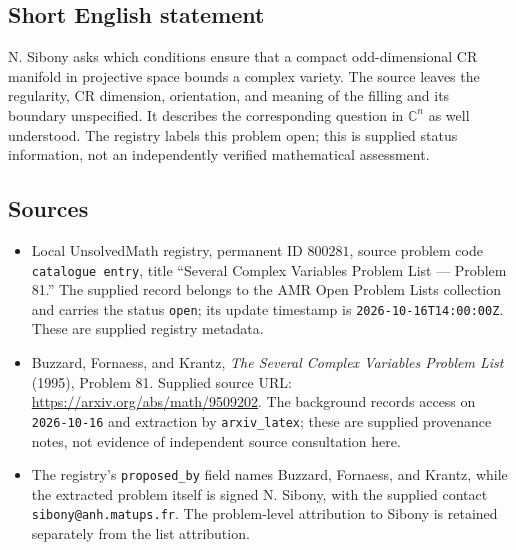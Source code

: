 \documentclass[11pt]{article}
\newcommand{\C}{\mathbb{C}}
\begin{document}
\subsection{Short English statement}
N. Sibony asks which conditions ensure that a compact odd-dimensional CR manifold in projective space bounds a complex variety. The source leaves the regularity, CR dimension, orientation, and meaning of the filling and its boundary unspecified. It describes the corresponding question in \(\C^n\) as well understood. The registry labels this problem open; this is supplied status information, not an independently verified mathematical assessment.
\subsection{Sources}
\begin{itemize}
\item Local UnsolvedMath registry, permanent ID \(800281\), source problem code \texttt{catalogue entry}, title ``Several Complex Variables Problem List --- Problem 81.'' The supplied record belongs to the AMR Open Problem Lists collection and carries the status \texttt{open}; its update timestamp is \texttt{2026-10-16T14:00:00Z}. These are supplied registry metadata.
\item Buzzard, Fornaess, and Krantz, \emph{The Several Complex Variables Problem List} (1995), Problem 81. Supplied source URL: \url{https://arxiv.org/abs/math/9509202}. The background records access on \texttt{2026-10-16} and extraction by \texttt{arxiv\_latex}; these are supplied provenance notes, not evidence of independent source consultation here.
\item The registry's \texttt{proposed\_by} field names Buzzard, Fornaess, and Krantz, while the extracted problem itself is signed N. Sibony, with the supplied contact \texttt{sibony@anh.matups.fr}. The problem-level attribution to Sibony is retained separately from the list attribution.
\end{itemize}
\end{document}
